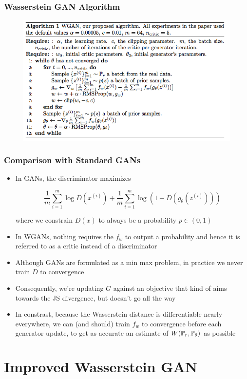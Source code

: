 \documentclass{beamer}
\begin{document}
\begin{frame}
\frametitle{Wasserstein GAN Algorithm}
\begin{figure}
\centering
\includegraphics[width=1.07\textwidth]{wgan.png}
\end{figure}
\end{frame}


\begin{frame}
\frametitle{Comparison with Standard GANs}
\begin{itemize}
\pause
\item{In GANs, the discriminator maximizes 

$$ \frac{1}{m} \sum_{i=1}^{m} \log D(x^{(i)}) + \frac{1}{m} \sum_{i=1}^{m} \log (1 - D(g_{\theta}(z^{(i)}))) $$ 

where we constrain $D(x)$ to always be a probability $p \in (0,1)$}
\pause
\item{In WGANs, nothing requires the $f_{w}$ to output a probability and hence it is referred to as a critic instead of a discriminator}
\pause
\item{Although GANs are formulated as a min max problem, in practice we never train $D$ to convergence}
\pause
\item{Consequently, we're updating $G$ against an objective that kind of aims towards the JS divergence, but doesn't go all the way}
\pause
\item{In constrast, because the Wasserstein distance is differentiable nearly everywhere, we can (and should) train $f_{w}$ to convergence before each generator update, to get as accurate an estimate of $W(\P_{r},\P_{\theta})$ as possible}
\end{itemize}
\end{frame}

\section{Improved Wasserstein GAN}
\begin{frame}
\tableofcontents[currentsection]
\end{frame}
\end{document}
